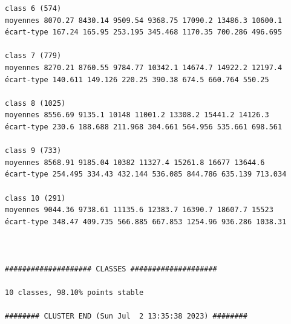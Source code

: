 \documentclass[analytics,article,accept,pdftex,moreauthors]{Definitions/mdpi}
\begin{document}
\begin{footnotesize}
\begin{verbatim}
class 6 (574)
moyennes 8070.27 8430.14 9509.54 9368.75 17090.2 13486.3 10600.1
écart-type 167.24 165.95 253.195 345.468 1170.35 700.286 496.695

class 7 (779)
moyennes 8270.21 8760.55 9784.77 10342.1 14674.7 14922.2 12197.4
écart-type 140.611 149.126 220.25 390.38 674.5 660.764 550.25

class 8 (1025)
moyennes 8556.69 9135.1 10148 11001.2 13308.2 15441.2 14126.3
écart-type 230.6 188.688 211.968 304.661 564.956 535.661 698.561

class 9 (733)
moyennes 8568.91 9185.04 10382 11327.4 15261.8 16677 13644.6
écart-type 254.495 334.43 432.144 536.085 844.786 635.139 713.034

class 10 (291)
moyennes 9044.36 9738.61 11135.6 12383.7 16390.7 18607.7 15523
écart-type 348.47 409.735 566.885 667.853 1254.96 936.286 1038.31



#################### CLASSES ####################

10 classes, 98.10% points stable

######## CLUSTER END (Sun Jul  2 13:35:38 2023) ########

\end{verbatim}
\end{footnotesize}
\end{document}
